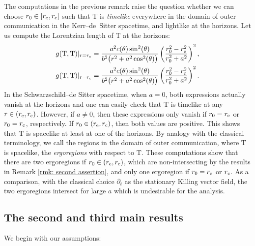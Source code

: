 \documentclass[10pt,a4paper]{amsart}
\renewcommand{\d}{\partial}
\newcommand{\T}{\mathrm T}
\numberwithin{equation}{section}
\begin{document}
\begin{Remark} \label{rmk: time inv}
The computations in the previous remark raise the question whether we can choose $r_0 \in [r_{\rm e}, r_{\rm c}]$ such that $\T$ is \emph{timelike} everywhere in the domain of outer communication in the Kerr--de~Sitter spacetime, and lightlike at the horizons.
Let us compute the Lorentzian length of $\T$ at the horizons:
\begin{align*}
	g(\T,\T)|_{r = r_{\rm e}}
		= \frac{a^2 c(\theta)\sin^2(\theta)}{b^2\big(r^2 + a^2 \cos^2(\theta)\big)}\left(\frac{r_0^2-r_{\rm e}^2}{r_0^2 + a^2}\right)^2, \\
	g(\T,\T)|_{r = r_{\rm c}}
		= \frac{a^2 c(\theta)\sin^2(\theta)}{b^2\big(r^2 + a^2 \cos^2(\theta)\big)}\left(\frac{r_0^2-r_{\rm c}^2}{r_0^2 + a^2}\right)^2.
\end{align*}
In the Schwarzschild--de Sitter spacetime, when $a = 0$, both expressions actually vanish at the horizons and one can easily check that $\T$ is timelike at any $r \in (r_{\rm e}, r_{\rm c})$.
However, if $a \neq 0$, then these expressions only vanish if $r_0 = r_{\rm e}$ or $r_0 = r_{\rm c}$, respectively.
If $r_0 \in (r_{\rm e}, r_{\rm c})$, then both values are positive.
This shows that $\T$ is spacelike at least at one of the horizons.
By analogy with the classical terminology, we call the regions in the domain of outer communication, where $\T$ is spacelike, the \emph{ergoregions} with respect to $\T$.
These computations show that there are two ergoregions if $r_0 \in (r_{\rm e}, r_{\rm c})$, which are non-intersecting by the results in Remark \ref{rmk: second assertion}, and only one ergoregion if $r_0 = r_{\rm e}$ or $r_{\rm c}$.
As a comparison, with the classical choice $\d_t$ as the stationary Killing vector field, the two ergoregions intersect for large $a$ which is undesirable for the analysis.
\end{Remark}


\subsection{The second and third main results}\label{subsec:second result}
We begin with our assumptions:
\end{document}
